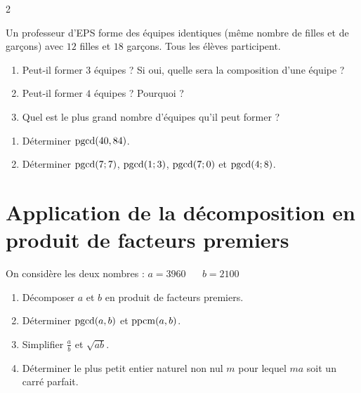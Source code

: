 \documentclass[10pt, a4paper]{article}
\begin{document}
\begin{multicols*}{2}
\begin{Activite}[][10 min]
Un professeur d'EPS forme des équipes identiques (même nombre de filles et de garçons) avec $12$ filles et $18$ garçons. Tous les élèves participent.

\begin{enumerate}[leftmargin=*,itemsep=0.5pt]
    \item Peut-il former $3$ équipes ? Si oui, quelle sera la composition d'une équipe ?
    \item Peut-il former $4$ équipes ? Pourquoi ?
    \item Quel est le plus grand nombre d'équipes qu'il peut former ?
\end{enumerate}
\end{Activite}

\begin{Application}[][10 min]
\begin{enumerate}[leftmargin=*,itemsep=0.5pt]
    \item Déterminer $\operatorname{pgcd}(40, 84)$.

    \item Déterminer $\operatorname{pgcd}(7;7)$, $\operatorname{pgcd}(1;3)$,  $\operatorname{pgcd}(7;0)$ et $\operatorname{pgcd}(4;8)$.

\end{enumerate}
\end{Application}


\section{Application de la décomposition en produit de facteurs premiers}

\begin{Application}[][20 min]
On considère les deux nombres : $a = 3960$ ~~ $b = 2100$
\begin{enumerate}[leftmargin=*,itemsep=0.5pt]
    \item Décomposer $a$ et $b$ en produit de facteurs premiers.
    \item Déterminer $\operatorname{pgcd}(a,b)$ et $\operatorname{ppcm}(a,b)$.
    \item Simplifier $\frac{a}{b}$ et $\sqrt{ab}$.
    \item Déterminer le plus petit entier naturel non nul $m$ pour lequel $ma$ soit un carré parfait.
\end{enumerate}
\end{Application}


\end{multicols*}
\end{document}
